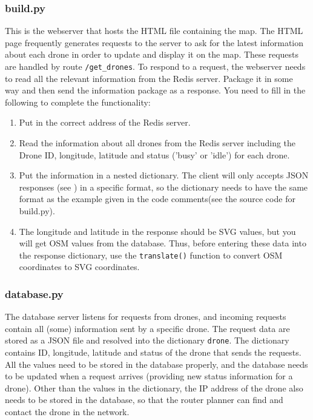 \documentclass{article}
\begin{document}
\subsubsection{build.py}
This is the webserver that hosts the HTML file containing the map. The HTML page frequently generates requests to the server to ask for the latest information about each drone in order to update and display it on the map. These requests are handled by route \verb!/get_drones!. To respond to a request, the webserver needs to read all the relevant information from the Redis server. Package it in some way and then send the information package as a response. You need to fill in the following to complete the functionality:
\begin{enumerate}
    \item Put in the correct address of the Redis server.
    \item Read the information about all drones from the Redis server including the Drone ID, longitude, latitude and status ('busy' or 'idle') for each drone.
    \item Put the information in a nested dictionary. The client will only accepts JSON responses (see \cite{json}) in a specific format, so the dictionary needs to have the same format as the example given in the code comments(see the source code for build.py).
    \item The longitude and latitude in the response should be SVG values, but you will get OSM values from the database. Thus, before entering these data into the response dictionary, use the \verb!translate()! function to convert OSM coordinates to SVG coordinates.
\end{enumerate}

\subsubsection{database.py}
The database server listens for requests from drones, and incoming requests contain all (some) information sent by a specific drone. The request data are stored as a JSON file and resolved into the dictionary \verb!drone!. The dictionary contains ID, longitude, latitude and status of the drone that sends the requests. All the values need to be stored in the database properly, and the database needs to be updated when a request arrives (providing new status information for a drone). Other than the values in the dictionary, the IP address of the drone also needs to be stored in the database, so that the router planner can find and contact the drone in the network.
\end{document}
